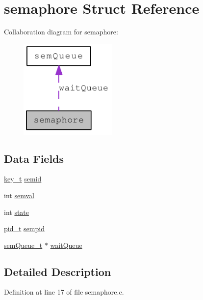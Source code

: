 \hypertarget{structsemaphore}{
\section{semaphore Struct Reference}
\label{structsemaphore}
}


Collaboration diagram for semaphore:\nopagebreak
\begin{figure}[H]
\begin{center}
\leavevmode
\includegraphics[width=136pt]{structsemaphore__coll__graph}
\end{center}
\end{figure}
\subsection*{Data Fields}
\begin{DoxyCompactItemize}
\item 
\hyperlink{types_8h_a158b5efbc244b8995c439d60c976c818}{key\_\-t} \hyperlink{structsemaphore_a9222a19bf63a4f9775ec6307f10955ac}{semid}
\item 
int \hyperlink{structsemaphore_a6191200d6dbe7f09897db13350a06c61}{semval}
\item 
int \hyperlink{structsemaphore_a89f234133d3efe315836311cbf21c64b}{state}
\item 
\hyperlink{types_8h_ab612a3a4eb0e2ced1e55ecff76260458}{pid\_\-t} \hyperlink{structsemaphore_ab2c2b336eae3da49c4f83d6f44c1fc7b}{sempid}
\item 
\hyperlink{structsem_queue}{semQueue\_\-t} $\ast$ \hyperlink{structsemaphore_aa98d8a188e5b2388de0be4c7c48709fe}{waitQueue}
\end{DoxyCompactItemize}


\subsection{Detailed Description}


Definition at line 17 of file semaphore.c.



